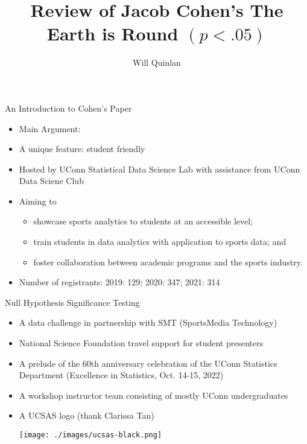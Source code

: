 \documentclass[aspectratio=169, 12pt]{beamer}
\title{Review of Jacob Cohen's The Earth is Round $(p < .05)$}
\author{Will Quinlan}
\begin{document}
 
\frame{\titlepage}

\begin{frame}{An Introduction to Cohen's Paper}
  \begin{itemize}
  \item Main Argument: 
  \item A unique feature: student friendly
  \item Hosted by UConn Statistical Data Science Lab with assistance from UConn
    Data Sciene Club
  \item Aiming to
    \begin{itemize}
    \item showcase sports analytics to students at an accessible
      level;
    \item train students in data analytics with application to
      sports data; and
    \item foster collaboration between academic programs and the
      sports industry.
    \end{itemize}
  \item Number of registrants: 2019: 129; 2020: 347; 2021: 314
  \end{itemize}
\end{frame}

\begin{frame}{Null Hypothesis Significance Testing}
  \begin{itemize}
  \item A data challenge in partnership with SMT (SportsMedia Technology)
  \item National Science Foundation travel support for student presenters
  \item A prelude of the 60th anniversary celebration of the UConn Statistics
    Department (Excellence in Statistics, Oct. 14-15, 2022)
  \item A workshop instructor team consisting of mostly UConn undergraduates
  \item A UCSAS logo (thank Clarissa Tan)
    
    \texttt{[image: ./images/ucsas-black.png]}
  \end{itemize}
\end{frame}
\end{document}
